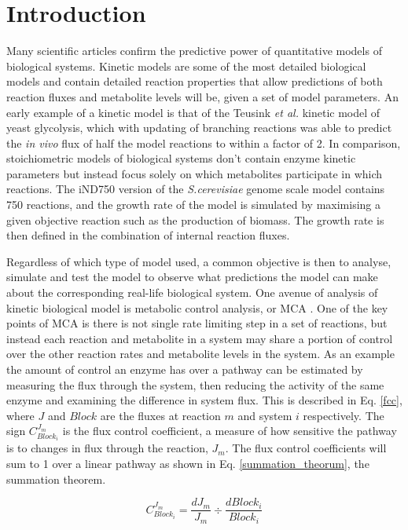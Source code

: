 \section{Introduction}

Many scientific articles confirm the predictive power of quantitative models of biological systems. Kinetic models are some of the most detailed biological models and contain detailed reaction properties that allow predictions of both reaction fluxes and metabolite levels will be, given a set of model parameters. An early example of a kinetic model is that of the Teusink \emph{et al.} \cite{teusink2000} kinetic model of yeast glycolysis, which with updating of branching reactions was able to predict the \emph{in vivo} flux of half the model reactions to within a factor of 2. In comparison, stoichiometric models of biological systems don't contain enzyme kinetic parameters but instead focus solely on which metabolites participate in which reactions. The iND750 version of the \emph{S.cerevisiae} genome scale model \cite{duarte2004} contains 750 reactions, and the growth rate of the model is simulated by maximising a given objective reaction such as the production of biomass. The growth rate is then defined in the combination of internal reaction fluxes.

Regardless of which type of model used, a common objective is then to analyse, simulate and test the model to observe what predictions the model can make about the corresponding real-life biological system. One avenue of analysis of kinetic biological model is metabolic control analysis, or MCA \cite{fell1997}. One of the key points of MCA is there is not single rate limiting step in a set of reactions, but instead each reaction and metabolite in a system may share a portion of control over the other reaction rates and metabolite levels in the system. As an example the amount of control an enzyme has over a pathway can be estimated by measuring the flux through the system, then reducing the activity of the same enzyme and examining the difference in system flux. This is described in Eq. \ref{fcc}, where $J$ and $Block$ are the fluxes at reaction $m$ and system $i$ respectively. The sign $C_{Block_i}^{J_m}$ is the flux control coefficient, a measure of how sensitive the pathway is to changes in flux through the reaction, $J_{m}$. The flux control coefficients will sum to 1 over a linear pathway as shown in Eq. \ref{summation_theorum}, the summation theorem.

\begin{equation}\label{fcc}
C_{Block_i}^{J_m} = \frac{dJ_m}{J_m}\div\frac{dBlock_i}{Block_i}
\end{equation}

